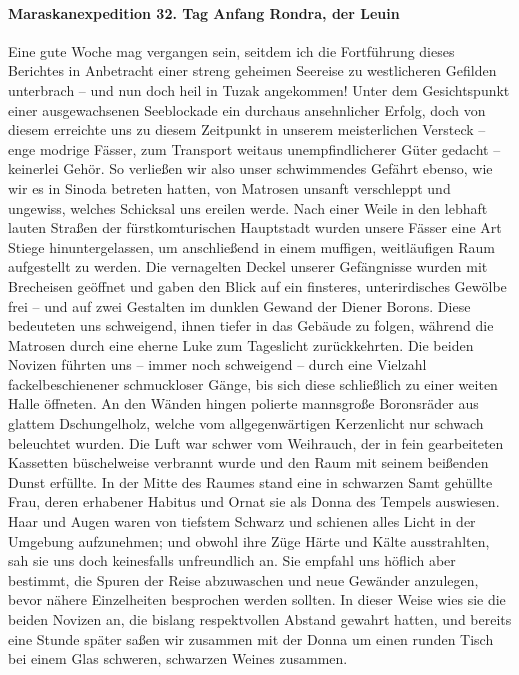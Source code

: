 \paragraph{Maraskanexpedition 32. Tag Anfang Rondra, der Leuin}
Eine gute Woche mag vergangen sein, seitdem ich die Fortführung dieses Berichtes in Anbetracht einer streng geheimen Seereise zu westlicheren Gefilden unterbrach -- und nun doch heil in Tuzak angekommen! Unter dem Gesichtspunkt einer ausgewachsenen Seeblockade ein durchaus ansehnlicher Erfolg, doch von diesem erreichte uns zu diesem Zeitpunkt in unserem meisterlichen Versteck -- enge modrige Fässer, zum Transport weitaus unempfindlicherer Güter gedacht -- keinerlei Gehör. So verließen wir also unser schwimmendes Gefährt ebenso, wie wir es in Sinoda betreten hatten, von Matrosen unsanft verschleppt und ungewiss, welches Schicksal uns ereilen werde. Nach einer Weile in den lebhaft lauten Straßen der fürstkomturischen Hauptstadt wurden unsere Fässer eine Art Stiege hinuntergelassen, um anschließend in einem muffigen, weitläufigen Raum aufgestellt zu werden. Die vernagelten Deckel unserer Gefängnisse wurden mit Brecheisen geöffnet und gaben den Blick auf ein finsteres, unterirdisches Gewölbe frei -- und auf zwei Gestalten im dunklen Gewand der Diener Borons. Diese bedeuteten uns schweigend, ihnen tiefer in das Gebäude zu folgen, während die Matrosen durch eine eherne Luke zum Tageslicht zurückkehrten. Die beiden Novizen führten uns -- immer noch schweigend -- durch eine Vielzahl fackelbeschienener schmuckloser Gänge, bis sich diese schließlich zu einer weiten Halle öffneten. An den Wänden hingen polierte mannsgroße Boronsräder aus glattem Dschungelholz, welche vom allgegenwärtigen Kerzenlicht nur schwach beleuchtet wurden. Die Luft war schwer vom Weihrauch, der in fein gearbeiteten Kassetten büschelweise verbrannt wurde und den Raum mit seinem beißenden Dunst erfüllte. In der Mitte des Raumes stand eine in schwarzen Samt gehüllte Frau, deren erhabener Habitus und Ornat sie als Donna des Tempels auswiesen. Haar und Augen waren von tiefstem Schwarz und schienen alles Licht in der Umgebung aufzunehmen; und obwohl ihre Züge Härte und Kälte ausstrahlten, sah sie uns doch keinesfalls unfreundlich an. Sie empfahl uns höflich aber bestimmt, die Spuren der Reise abzuwaschen und neue Gewänder anzulegen, bevor nähere Einzelheiten besprochen werden sollten. In dieser Weise wies sie die beiden Novizen an, die bislang respektvollen Abstand gewahrt hatten, und bereits eine Stunde später saßen wir zusammen mit der Donna um einen runden Tisch bei einem Glas schweren, schwarzen Weines zusammen.

